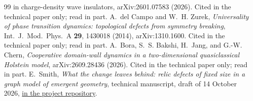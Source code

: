 \documentclass[11pt,letterpaper]{article}
\begin{document}
\begin{thebibliography}{99}
{in charge-density wave insulators}, arXiv:2601.07583 (2026). Cited in the technical paper only; read in
part.
 A.~del Campo and W.~H. Zurek, \emph{Universality of phase transition dynamics: topological
defects from symmetry breaking}, Int.\ J.\ Mod.\ Phys.\ A \textbf{29}, 1430018 (2014), arXiv:1310.1600.
Cited in the technical paper only; read in part.
 A.~Bora, S.~S. Bakshi, H.~Jang, and G.-W. Chern, \emph{Cooperative domain-wall dynamics in
a two-dimensional quasiclassical Holstein model}, arXiv:2609.28436 (2026). Cited in the technical paper
only; read in part.
 E.~Smith, \emph{What the change leaves behind: relic defects of fixed size in a graph model
of emergent geometry}, technical manuscript, draft of 14 October 2026,
\href{https://github.com/EmilySmithCreate/RecreationalPhysics/tree/main/docs/papers/02_relic}{in the project repository}.
\end{thebibliography}

\end{document}
